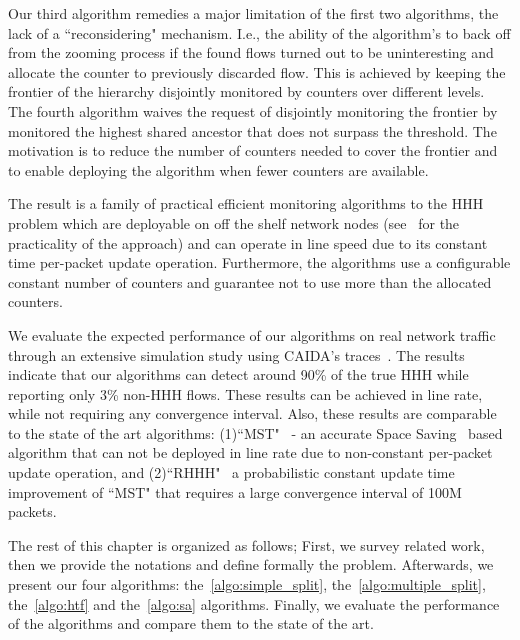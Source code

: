 Our third algorithm remedies a major limitation of the first two algorithms, the lack of a ``reconsidering" mechanism. I.e., the ability of the algorithm's to back off from the zooming process if the found flows turned out to be uninteresting and allocate the counter to previously discarded flow. This is achieved by keeping the frontier of the hierarchy disjointly monitored by counters over different levels.
The fourth algorithm waives the request of disjointly monitoring the frontier by monitored the highest shared ancestor that does not surpass the threshold. The motivation is to reduce the number of counters needed to cover the frontier and to enable deploying the algorithm when fewer counters are available.

The result is a family of practical efficient monitoring algorithms to the HHH problem which are deployable on off the shelf network nodes (see~\cite{Moraney2016} for the practicality of the approach) and can operate in line speed due to its constant time per-packet update operation. Furthermore, the algorithms use a configurable constant number of counters and guarantee not to use more than the allocated counters.

We evaluate the expected performance of our algorithms on real network traffic through an extensive simulation study using CAIDA’s traces~\cite{CAIDA2016, CAIDA2018}.
The results indicate that our algorithms can detect around 90\% of the true HHH while reporting only 3\% non-HHH flows. These results can be achieved in line rate, while not requiring any convergence interval. Also, these results are comparable to the state of the art algorithms: (1)``MST"~\cite{SpaceSaving} - an accurate Space Saving~\cite{Metwally2005} based algorithm that can not be deployed in line rate due to non-constant per-packet update operation, and (2)``RHHH"~\cite{ben2017constant} a probabilistic constant update time improvement of ``MST" that requires a large convergence interval of 100M packets.

The rest of this chapter is organized as follows; First, we survey related work, then we provide the notations and define formally the problem. Afterwards, we present our four algorithms: the~\ref{algo:simple_split}, the~\ref{algo:multiple_split}, the~\ref{algo:htf} and the~\ref{algo:sa} algorithms. Finally, we evaluate the performance of the algorithms and compare them to the state of the art.
